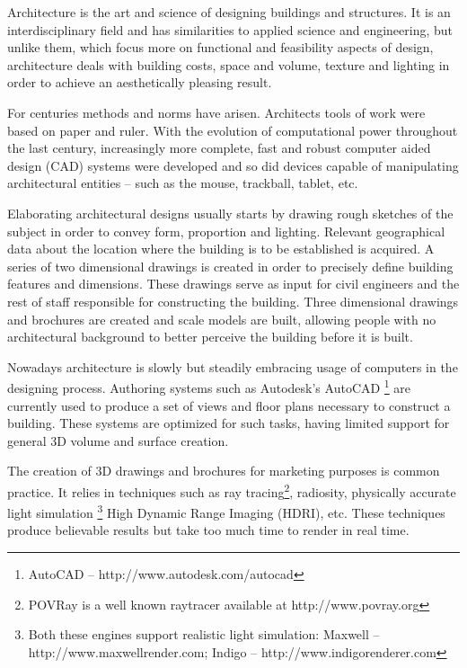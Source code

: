 
Architecture is the art and science of designing buildings and structures.
It is an interdisciplinary field and has similarities to applied science and
engineering, but unlike them, which focus more on functional and feasibility aspects of design, 
architecture deals with building costs, space and volume, texture and lighting
in order to achieve an aesthetically pleasing result.

For centuries methods and norms have arisen. Architects tools of work were based on paper and ruler.
With the evolution of computational power throughout the last century, 
increasingly more complete, fast and robust computer aided design (CAD) systems were developed and so did
devices capable of manipulating architectural entities -- such as the mouse, trackball, tablet, etc.

Elaborating architectural designs usually starts by drawing rough sketches of the subject
in order to convey form, proportion and lighting. Relevant geographical data about the location
where the building is to be established is acquired. A series of two dimensional drawings is created
in order to precisely define building features and dimensions.
These drawings serve as input for civil engineers and the rest of staff responsible for constructing the building.
Three dimensional drawings and brochures are created and scale models are built, allowing
people with no architectural background to better perceive the building before it is built.

Nowadays architecture is slowly but steadily embracing usage of computers in the designing process.
Authoring systems such as Autodesk's AutoCAD
\footnote{AutoCAD -- http://www.autodesk.com/autocad}\nocite{SITE-AUTOCAD}
are currently used to produce a set of views and floor plans necessary to construct a building.
These systems are optimized for such tasks, having limited support for general 3D volume and surface creation.

The creation of 3D drawings and brochures for marketing purposes is common practice.
It relies in techniques such as
ray tracing\footnote{POVRay is a well known raytracer available at http://www.povray.org}\nocite{SITE-POVRAY},
radiosity,
physically accurate light simulation
\footnote{Both these engines support realistic light simulation:
Maxwell -- http://www.maxwellrender.com\nocite{SITE-MAXWELL};
Indigo -- http://www.indigorenderer.com\nocite{SITE-INDIGO}
}
High Dynamic Range Imaging (HDRI), etc.
These techniques produce believable results but take too much time to render in real time.

